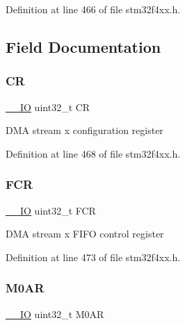 Definition at line 466 of file stm32f4xx.\+h.



\subsection{Field Documentation}
\mbox{\label{struct_d_m_a___stream___type_def_ab40c89c59391aaa9d9a8ec011dd0907a}} 
\subsubsection{\texorpdfstring{CR}{CR}}
{\footnotesize\ttfamily \hyperlink{group___c_m_s_i_s__core__definitions_gaec43007d9998a0a0e01faede4133d6be}{\+\_\+\+\_\+\+IO} uint32\+\_\+t CR}

D\+MA stream x configuration register 

Definition at line 468 of file stm32f4xx.\+h.

\mbox{\label{struct_d_m_a___stream___type_def_a5d5cc7f32884945503dd29f8f6cbb415}} 
\subsubsection{\texorpdfstring{F\+CR}{FCR}}
{\footnotesize\ttfamily \hyperlink{group___c_m_s_i_s__core__definitions_gaec43007d9998a0a0e01faede4133d6be}{\+\_\+\+\_\+\+IO} uint32\+\_\+t F\+CR}

D\+MA stream x F\+I\+FO control register 

Definition at line 473 of file stm32f4xx.\+h.

\mbox{\label{struct_d_m_a___stream___type_def_a63b4d166f4ab5024db6b493a7ab7b640}} 
\subsubsection{\texorpdfstring{M0\+AR}{M0AR}}
{\footnotesize\ttfamily \hyperlink{group___c_m_s_i_s__core__definitions_gaec43007d9998a0a0e01faede4133d6be}{\+\_\+\+\_\+\+IO} uint32\+\_\+t M0\+AR}

